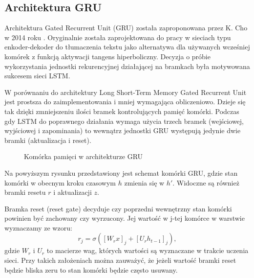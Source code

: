 \documentclass[10pt,a4paper]{article}
\begin{document}
\subsection{Architektura GRU}

Architektura Gated Recurrent Unit (GRU) została zaproponowana przez K. Cho w 2014 roku \cite{https://doi.org/10.48550/arxiv.1406.1078}. Oryginalnie została zaprojektowana do pracy w sieciach typu enkoder-dekoder do tłumaczenia tekstu jako alternatywa dla używanych wcześniej komórek z funkcją aktywacji tangens hiperboliczny. Decyzja o próbie wykorzystania jednostki rekurencyjnej działającej na bramkach była motywowana sukcesem sieci LSTM.

W porównaniu do architektury Long Short-Term Memory Gated Recurrent Unit jest prostsza do zaimplementowania i mniej wymagająca obliczeniowo. Dzieje się tak dzięki zmniejszeniu ilości bramek kontrolujących pamięć komórki. Podczas gdy LSTM do poprawnego działania wymaga użycia trzech bramek (wejściowej, wyjściowej i zapominania) to wewnątrz jednostki GRU występują jedynie dwie bramki (aktualizacja i reset). 

\begin{figure}[!ht]
	\centering
	\caption{Komórka pamięci w architekturze GRU}
\end{figure}
\FloatBarrier

Na powyższym rysunku przedstawiony jest schemat komórki GRU, gdzie stan komórki w obecnym kroku czasowym $h$ zmienia się w $h'$. Widoczne są również bramki resetu $r$ i aktualizacji $z$. 

Bramka reset (reset gate) decyduje czy poprzedni wewnętrzny stan komórki powinien być zachowany czy wyrzucony. Jej wartość w j-tej komórce w warstwie wyznaczamy ze wzoru:
\begin{equation}
	r_j = \sigma([W_rx]_j + [U_rh_{t-1}]_j),
\end{equation} 
gdzie $W_r$ i $U_r$ to macierze wag, których wartości są wyznaczane w trakcie uczenia sieci. Przy takich założeniach można zauważyć, że jeżeli wartość bramki reset będzie bliska zeru to stan komórki będzie często usuwany.
\end{document}
